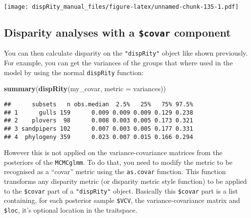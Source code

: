 \documentclass[
]{book}
\newenvironment{Shaded}{\begin{snugshade}}{\end{snugshade}}
\newcommand{\AttributeTok}[1]{\textcolor[rgb]{0.13,0.29,0.53}{#1}}
\newcommand{\DecValTok}[1]{\textcolor[rgb]{0.00,0.00,0.81}{#1}}
\newcommand{\DocumentationTok}[1]{\textcolor[rgb]{0.56,0.35,0.01}{\textbf{\textit{#1}}}}
\newcommand{\FunctionTok}[1]{\textcolor[rgb]{0.13,0.29,0.53}{\textbf{#1}}}
\newcommand{\NormalTok}[1]{#1}
\newcommand{\SpecialCharTok}[1]{\textcolor[rgb]{0.81,0.36,0.00}{\textbf{#1}}}
\newcommand{\StringTok}[1]{\textcolor[rgb]{0.31,0.60,0.02}{#1}}
\begin{document}
\texttt{[image: dispRity\_manual\_files/figure-latex/unnamed-chunk-135-1.pdf]}

\hypertarget{disparity-analyses-with-a-covar-component}{%
\subsection{\texorpdfstring{Disparity analyses with a \texttt{\$covar} component}{Disparity analyses with a \$covar component}}\label{disparity-analyses-with-a-covar-component}}

You can then calculate disparity on the \texttt{"dispRity"} object like shown previously.
For example, you can get the variances of the groups that where used in the model by using the normal \texttt{dispRity} function:

\begin{Shaded}
\begin{Highlighting}[]
\FunctionTok{summary}\NormalTok{(}\FunctionTok{dispRity}\NormalTok{(my\_covar, }\AttributeTok{metric =}\NormalTok{ variances))}
\end{Highlighting}
\end{Shaded}

\begin{verbatim}
##      subsets   n obs.median  2.5%   25%   75% 97.5%
## 1      gulls 159      0.009 0.009 0.009 0.129 0.238
## 2    plovers  98      0.008 0.003 0.005 0.173 0.321
## 3 sandpipers 102      0.007 0.003 0.005 0.177 0.331
## 4  phylogeny 359      0.023 0.007 0.015 0.166 0.294
\end{verbatim}

However this is not applied on the variance-covariance matrices from the posteriors of the \texttt{MCMCglmm}.
To do that, you need to modify the metric to be recognised as a ``covar'' metric using the \texttt{as.covar} function.
This function transforms any disparity metric (or disparity metric style function) to be applied to the \texttt{\$covar} part of a \texttt{"dispRity"} object.
Basically this \texttt{\$covar} part is a list containing, for each posterior sample \texttt{\$VCV}, the variance-covariance matrix and \texttt{\$loc}, it's optional location in the traitspace.

\begin{Shaded}
\end{Shaded}
\end{document}
